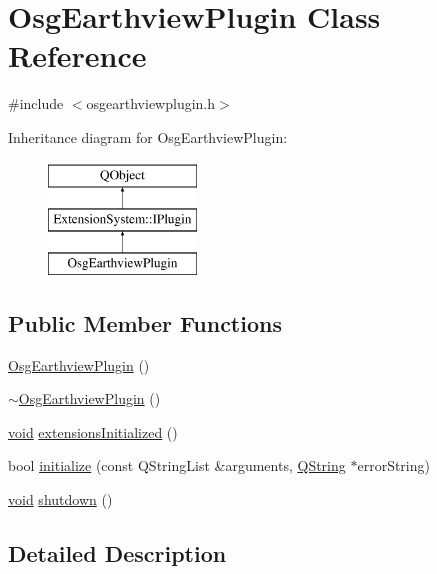 \hypertarget{class_osg_earthview_plugin}{\section{Osg\-Earthview\-Plugin Class Reference}
\label{class_osg_earthview_plugin}
}


{\ttfamily \#include $<$osgearthviewplugin.\-h$>$}

Inheritance diagram for Osg\-Earthview\-Plugin\-:\begin{figure}[H]
\begin{center}
\leavevmode
\includegraphics[height=3.000000cm]{class_osg_earthview_plugin}
\end{center}
\end{figure}
\subsection*{Public Member Functions}
\begin{DoxyCompactItemize}
\item 
\hyperlink{group___o_p_map_plugin_ga695dc06ca46ce6939cf95ef27f90be72}{Osg\-Earthview\-Plugin} ()
\item 
\hyperlink{group___o_p_map_plugin_ga67b03faca8613bf17a0623ae18791913}{$\sim$\-Osg\-Earthview\-Plugin} ()
\item 
\hyperlink{group___u_a_v_objects_plugin_ga444cf2ff3f0ecbe028adce838d373f5c}{void} \hyperlink{group___o_p_map_plugin_ga67c92e6b50be6d0152700ea331726933}{extensions\-Initialized} ()
\item 
bool \hyperlink{group___o_p_map_plugin_gad25998380d6a05042f2a787e6ea00cee}{initialize} (const Q\-String\-List \&arguments, \hyperlink{group___u_a_v_objects_plugin_gab9d252f49c333c94a72f97ce3105a32d}{Q\-String} $\ast$error\-String)
\item 
\hyperlink{group___u_a_v_objects_plugin_ga444cf2ff3f0ecbe028adce838d373f5c}{void} \hyperlink{group___o_p_map_plugin_gac453d0b59f26d74b1a48cf92c59b9d8e}{shutdown} ()
\end{DoxyCompactItemize}


\subsection{Detailed Description}


